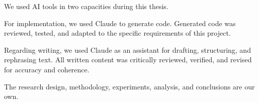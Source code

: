 \documentclass[headsepline,footsepline,footinclude=false,oneside,fontsize=11pt,paper=a4,listof=totoc,bibliography=totoc]{scrbook} %
\begin{document}


\frontmatter{}





\tableofcontents{}

\mainmatter{}









\appendix{}






\listoffigures{}
\listoftables{}


We used AI tools in two capacities during this thesis.

For implementation, we used Claude to generate code.
Generated code was reviewed, tested, and adapted to the specific requirements of this project.

Regarding writing, we used Claude as an assistant for drafting, structuring, and rephrasing text.
All written content was critically reviewed, verified, and revised for accuracy and coherence.

The research design, methodology, experiments, analysis, and conclusions are our own.

\printbibliography{}
\end{document}

